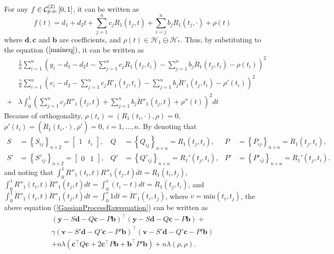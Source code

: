 For any $f\in\mathcal{C}_{\footnotesize p.w.}^{(2)}[0,1]$, it can be written as 
\begin{equation}\label{GaussianProcessFunctionF}
f(t)=d_1+d_2t+\sum_{j=1}^{n}c_jR_1(t_j,t)+\sum_{i=j}^{n}b_j\dot{R}_1(t_j,\cdot) +\rho(t)
\end{equation}
where $\mathbf{d},\mathbf{c}$ and $\mathbf{b}$ are coefficients, and $\rho(t) \in \mathcal{H}_1 \ominus \mathcal{H}_*$. Thus, by substituting to the equation $(\ref{maineq})$, it can be written as 
\begin{equation}\label{GassianProcessRawequation}
\begin{split}
&\frac{1}{n}\sum_{i=1}^n \left( y_i - d_1-d_2t-\sum_{j=1}^{n}c_jR_1(t_j,t_i)-\sum_{j=1}^{n}b_j\dot{R}_1(t_j,t_i)-\rho(t_i) \right) ^2\\
&\frac{\gamma}{n}\sum_{i=1}^n \left( v_i - d_2-\sum_{j=1}^{n}c_jR'_1(t_j,t_i)-\sum_{j=1}^{n}b_j\dot{R}'_1(t_j,t_i)-\rho'(t_i) \right) ^2\\
+&\lambda \int_0^1 \left( \sum_{j=1}^{n}c_jR''_1(t_j,t)+\sum_{j=1}^{n}b_j\dot{R}''_1(t_j,t)+\rho''(t)\right)^2dt
\end{split}
\end{equation}
Because of orthogonality, $\rho(t_i) = \left(R_1(t_i,\cdot),\rho\right)=0$, $\rho'(t_i) = \left(\dot{R}_1(t_i,\cdot),\rho'\right)=0$, $i=1,\ldots,n$. By denoting that 
\begin{align*}
S&=\left\lbrace S_{ij} \right\rbrace_{n\times 2}=\begin{bmatrix}1 & t_i \end{bmatrix} ,& Q&=\left\lbrace Q_{ij} \right\rbrace_{n\times n}= R_1(t_j,t_i), & P&=\left\lbrace P_{ij} \right\rbrace_{n\times n}= \dot{R}_1(t_j,t_i), \\
S'&=\left\lbrace S'_{ij} \right\rbrace_{n\times 2}=\begin{bmatrix} 0 & 1 \end{bmatrix} ,& Q'&=\left\lbrace Q'_{ij} \right\rbrace_{n\times n}= R_1'(t_j,t_i), & P'&=\left\lbrace P'_{ij} \right\rbrace_{n\times n}= \dot{R}_1'(t_j,t_i). 
\end{align*}
and noting that $\int_0^1R''_1(t_i,t)R''_1(t_j,t)dt=R_1(t_i,t_j)$, $\int_0^1R''_1(t_i,t)\dot{R}''_1(t_j,t)dt=\int_0^{v}(t_i-t)dt=\dot{R}_1(t_j,t_i)$, and $\int_0^1\dot{R}''_1(t_i,t)\dot{R}''_1(t_j,t)dt=\int_0^{v}1dt=\dot{R}'_1(t_i,t_j)$, where $v=\mbox{min}(t_i,t_j)$, the above equation (\ref{GassianProcessRawequation}) can be written as 
\begin{equation}\label{matriteq}
\begin{split}
\left(\mathbf{y}-S\mathbf{d}-Q\mathbf{c}-P\mathbf{b}\right)^\top \left(\mathbf{y}-S\mathbf{d}-Q\mathbf{c}-P\mathbf{b}\right)+\\
\gamma\left(\mathbf{v}-S'\mathbf{d}-Q'\mathbf{c}-P'\mathbf{b}\right)^\top \left(\mathbf{v}-S'\mathbf{d}-Q'\mathbf{c}-P'\mathbf{b}\right)\\
+n\lambda \left(\mathbf{c}^\top Q\mathbf{c} + 2\mathbf{c}^\top P\mathbf{b}+ \mathbf{b}^\top P'\mathbf{b}\right)+n\lambda\left(\rho,\rho\right).
\end{split}
\end{equation}
